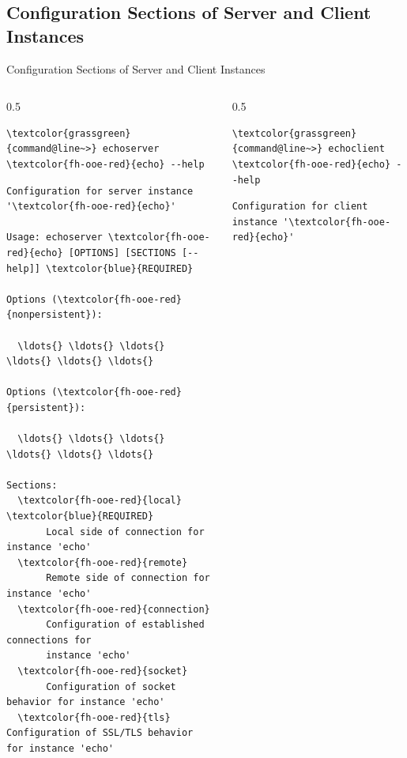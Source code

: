 \subsection{Configuration Sections of Server and Client Instances}

\begin{frame}[fragile]{Configuration Sections of Server and Client Instances}
\begin{columns}[T, onlytextwidth]
\begin{column}{0.5\textwidth}
\begin{scriptsize}
\begin{Verbatim}[commandchars=\\\{\}]
\textcolor{grassgreen}{command@line~>} echoserver \textcolor{fh-ooe-red}{echo} --help
\end{Verbatim}
\begin{Verbatim}[commandchars=\\\{\},frame=leftline,rulecolor=\color{fh-ooe-red}]
Configuration for server instance '\textcolor{fh-ooe-red}{echo}'

Usage: echoserver \textcolor{fh-ooe-red}{echo} [OPTIONS] [SECTIONS [--help]] \textcolor{blue}{REQUIRED}

Options (\textcolor{fh-ooe-red}{nonpersistent}):

  \ldots{} \ldots{} \ldots{} \ldots{} \ldots{} \ldots{}

Options (\textcolor{fh-ooe-red}{persistent}):

  \ldots{} \ldots{} \ldots{} \ldots{} \ldots{} \ldots{}

Sections:
  \textcolor{fh-ooe-red}{local} \textcolor{blue}{REQUIRED}
       Local side of connection for instance 'echo'
  \textcolor{fh-ooe-red}{remote}
       Remote side of connection for instance 'echo'
  \textcolor{fh-ooe-red}{connection}
       Configuration of established connections for
       instance 'echo'
  \textcolor{fh-ooe-red}{socket}
       Configuration of socket behavior for instance 'echo'
  \textcolor{fh-ooe-red}{tls}  Configuration of SSL/TLS behavior for instance 'echo'
\end{Verbatim}
\end{scriptsize}
\end{column}
\begin{column}{0.5\textwidth}
\begin{scriptsize}
\begin{Verbatim}[commandchars=\\\{\}]
\textcolor{grassgreen}{command@line~>} echoclient \textcolor{fh-ooe-red}{echo} --help
\end{Verbatim}
\begin{Verbatim}[commandchars=\\\{\},frame=leftline,rulecolor=\color{fh-ooe-red}]
Configuration for client instance '\textcolor{fh-ooe-red}{echo}'


\end{Verbatim}
\end{scriptsize}
\end{column}
\end{columns}
\end{frame}
